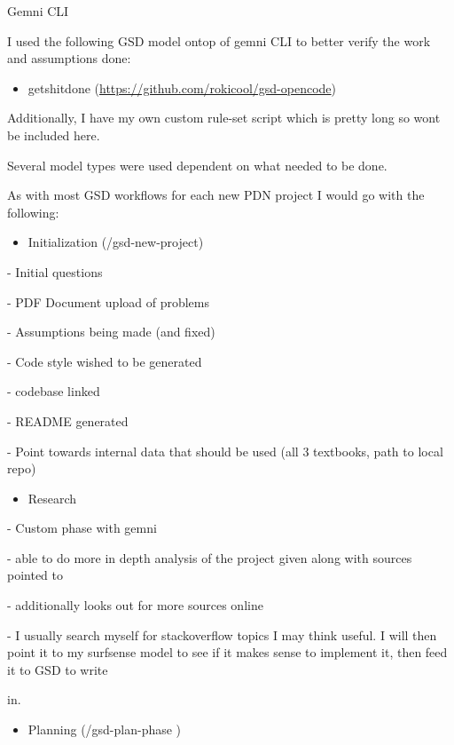 \documentclass[
]{article}
\begin{document}
Gemni CLI

I used the following GSD model ontop of gemni CLI to better verify the
work and assumptions done:

\begin{itemize}
\item
  getshitdone (\url{https://github.com/rokicool/gsd-opencode})
\end{itemize}

Additionally, I have my own custom rule-set script which is pretty long
so won\textquotesingle t be included here.

Several model types were used dependent on what needed to be done.

As with most GSD workflows for each new PDN project I would go with the
following:

\begin{itemize}
\item
  Initialization (/gsd-new-project)
\end{itemize}

- Initial questions

- PDF Document upload of problems

- Assumptions being made (and fixed)

- Code style wished to be generated

- codebase linked

- README generated

- Point towards internal data that should be used (all 3 textbooks, path
to local repo)

\begin{itemize}
\item
  Research
\end{itemize}

- Custom phase with gemni

- able to do more in depth analysis of the project given along with
sources pointed to

- additionally looks out for more sources online

- I usually search myself for stackoverflow topics I may think useful. I
will then point it to my surfsense model to see if it makes sense to
implement it, then feed it to GSD to write

in.

\begin{itemize}
\item
  Planning (/gsd-plan-phase )
\end{itemize}
\end{document}
